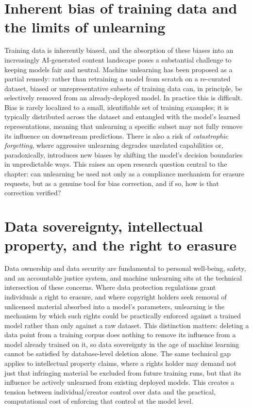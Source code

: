 \documentclass{surreydissertation}
\begin{document}
\section{Inherent bias of training data and the limits of unlearning}
Training data is inherently biased, and the absorption of these biases into an increasingly AI-generated content landscape poses a substantial challenge to keeping models fair and neutral. Machine unlearning has been proposed as a partial remedy: rather than retraining a model from scratch on a re-curated dataset, biased or unrepresentative subsets of training data can, in principle, be selectively removed from an already-deployed model. In practice this is difficult. Bias is rarely localized to a small, identifiable set of training examples; it is typically distributed across the dataset and entangled with the model's learned representations, meaning that unlearning a specific subset may not fully remove its influence on downstream predictions. There is also a risk of \textit{catastrophic forgetting}, where aggressive unlearning degrades unrelated capabilities or, paradoxically, introduces new biases by shifting the model's decision boundaries in unpredictable ways. This raises an open research question central to the chapter: can unlearning be used not only as a compliance mechanism for erasure requests, but as a genuine tool for bias correction, and if so, how is that correction verified?

\section{Data sovereignty, intellectual property, and the right to erasure}
Data ownership and data security are fundamental to personal well-being, safety, and an accountable justice system, and machine unlearning sits at the technical intersection of these concerns. Where data protection regulations grant individuals a right to erasure, and where copyright holders seek removal of unlicensed material absorbed into a model's parameters, unlearning is the mechanism by which such rights could be practically enforced against a trained model rather than only against a raw dataset. This distinction matters: deleting a data point from a training corpus does nothing to remove its influence from a model already trained on it, so data sovereignty in the age of machine learning cannot be satisfied by database-level deletion alone. The same technical gap applies to intellectual property claims, where a rights holder may demand not just that infringing material be excluded from future training runs, but that its influence be actively unlearned from existing deployed models. This creates a tension between individual/creator control over data and the practical, computational cost of enforcing that control at the model level.
\end{document}

